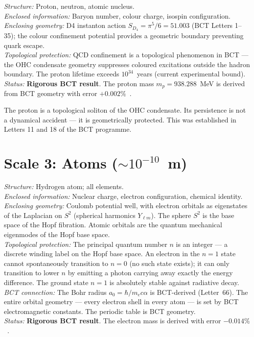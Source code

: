 \documentclass[aps,prl,preprint,superscriptaddress,floatfix]{revtex4-2}
\begin{document}
\textit{Structure:} Proton, neutron, atomic nucleus.\\
\textit{Enclosed information:} Baryon number, colour charge,
isospin configuration.\\
\textit{Enclosing geometry:} D4 instanton action
$S_{D_4} = \pi^5/6 = 51.003$ (BCT Letters 1--35); the colour
confinement potential provides a geometric boundary preventing
quark escape.\\
\textit{Topological protection:} QCD confinement is a topological
phenomenon in BCT --- the OHC condensate geometry suppresses
coloured excitations outside the hadron boundary. The proton
lifetime exceeds $10^{34}$~years (current experimental bound).\\
\textit{Status:} \textbf{Rigorous BCT result}. The proton mass
$m_p = 938.288$~MeV is derived from BCT geometry with error
$+0.002\%$~\cite{prl}.

The proton is a topological soliton of the OHC condensate. Its
persistence is not a dynamical accident --- it is geometrically
protected. This was established in Letters 11 and 18 of the BCT
programme.

\section{Scale 3: Atoms ($\sim 10^{-10}$~m)}

\textit{Structure:} Hydrogen atom; all elements.\\
\textit{Enclosed information:} Nuclear charge, electron configuration,
chemical identity.\\
\textit{Enclosing geometry:} Coulomb potential well, with electron
orbitals as eigenstates of the Laplacian on $S^2$ (spherical
harmonics $Y_{\ell m}$). The sphere $S^2$ is the base space of
the Hopf fibration. Atomic orbitals are the quantum mechanical
eigenmodes of the Hopf base space.\\
\textit{Topological protection:} The principal quantum number $n$
is an integer --- a discrete winding label on the Hopf base space.
An electron in the $n = 1$ state cannot spontaneously transition to
$n = 0$ (no such state exists); it can only transition to lower
$n$ by emitting a photon carrying away exactly the energy difference.
The ground state $n = 1$ is absolutely stable against radiative
decay.\\
\textit{BCT connection:} The Bohr radius $a_0 = \hbar/m_e c\alpha$
is BCT-derived (Letter~66). The entire orbital geometry --- every
electron shell in every atom --- is set by BCT electromagnetic
constants. The periodic table is BCT geometry.\\
\textit{Status:} \textbf{Rigorous BCT result}. The electron mass
is derived with error $-0.014\%$~\cite{prl}.
\end{document}
